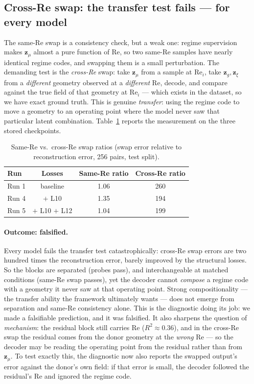 \documentclass[11pt]{article}
\begin{document}
\subsection{Cross-Re swap: the transfer test fails --- for every model}

The same-Re swap is a consistency check, but a weak one: regime
supervision makes $\boldsymbol{z}_{\mu}$ almost a pure function of Re, so
two same-Re samples have nearly identical regime codes, and swapping them
is a small perturbation. The demanding test is the \emph{cross-Re} swap:
take $\boldsymbol{z}_{\mu}$ from a sample at $\mathrm{Re}_i$, take
$\boldsymbol{z}_{g}, \boldsymbol{z}_{\xi}$ from a \emph{different}
geometry observed at a \emph{different} Re, decode, and compare against
the true field of that geometry at $\mathrm{Re}_i$ --- which exists in
the dataset, so we have exact ground truth. This is genuine
\emph{transfer}: using the regime code to move a geometry to an operating
point where the model never saw that particular latent combination.
Table~\ref{tab:xswap} reports the measurement on the three stored
checkpoints.

\begin{table}[htbp]
  \centering
  \caption{Same-Re vs.\ cross-Re swap ratios (swap error relative to
  reconstruction error, 256 pairs, test split).}
  \label{tab:xswap}
  \begin{tabular}{lccc}
    \toprule
    Run & Losses & Same-Re ratio & Cross-Re ratio \\
    \midrule
    Run 1 & baseline            & 1.06 & 260 \\
    Run 4 & $+$ L10             & 1.35 & 194 \\
    Run 5 & $+$ L10 $+$ L12     & 1.04 & 199 \\
    \bottomrule
  \end{tabular}
\end{table}

\paragraph{Outcome: falsified.} Every model fails the transfer test
catastrophically: cross-Re swap errors are two hundred times the
reconstruction error, barely improved by the structural losses. So the
blocks are separated (probes pass), and interchangeable at matched
conditions (same-Re swap passes), yet the decoder cannot \emph{compose} a
regime code with a geometry it never saw at that operating point. Strong
compositionality --- the transfer ability the framework ultimately wants
--- does not emerge from separation and same-Re consistency alone. This
is the diagnostic doing its job: we made a falsifiable prediction, and it
was falsified. It also sharpens the question of \emph{mechanism}: the
residual block still carries Re ($R^2 \approx 0.36$), and in the cross-Re
swap the residual comes from the donor geometry at the \emph{wrong} Re
--- so the decoder may be reading the operating point from the residual
rather than from $\boldsymbol{z}_{\mu}$. To test exactly this, the
diagnostic now also reports the swapped output's error against the
donor's own field: if that error is small, the decoder followed the
residual's Re and ignored the regime code.
\end{document}
